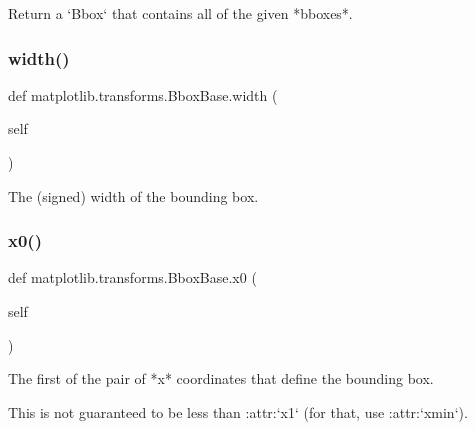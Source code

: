 \begin{DoxyVerb}Return a `Bbox` that contains all of the given *bboxes*.\end{DoxyVerb}
 \mbox{\label{classmatplotlib_1_1transforms_1_1BboxBase_adf5b955aae1307fb4541cdcc5bd7acf2}} 
\subsubsection{\texorpdfstring{width()}{width()}}
{\footnotesize\ttfamily def matplotlib.\+transforms.\+Bbox\+Base.\+width (\begin{DoxyParamCaption}\item[{}]{self }\end{DoxyParamCaption})}

\begin{DoxyVerb}The (signed) width of the bounding box.\end{DoxyVerb}
 \mbox{\label{classmatplotlib_1_1transforms_1_1BboxBase_a426599036a5f39ef257bab0ae084189f}} 
\subsubsection{\texorpdfstring{x0()}{x0()}}
{\footnotesize\ttfamily def matplotlib.\+transforms.\+Bbox\+Base.\+x0 (\begin{DoxyParamCaption}\item[{}]{self }\end{DoxyParamCaption})}

\begin{DoxyVerb}The first of the pair of *x* coordinates that define the bounding box.

This is not guaranteed to be less than :attr:`x1` (for that, use
:attr:`xmin`).
\end{DoxyVerb}
 \mbox{\label{classmatplotlib_1_1transforms_1_1BboxBase_aedc05db4a446ed350213282d807cc8e5}} 
